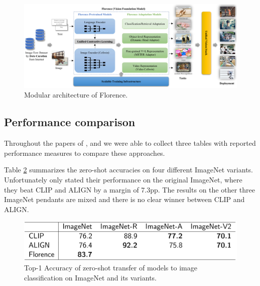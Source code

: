 \documentclass[
]{krantz}
\begin{document}
\begin{figure}

{\centering \includegraphics[width=1\linewidth]{figures/02-04-text-support-img/florence-architecture} 

}

\caption{Modular architecture of Florence.}\label{fig:florence-architecture}
\end{figure}



\hypertarget{performanceComp}{%
\subsection{Performance comparison}\label{performanceComp}}

Throughout the papers of \citet{radford2021learning}, \citet{jia2021scaling} and \citet{yuan2021florence} we were able to collect three tables with reported performance measures to compare these approaches.

Table \ref{fig:table1} summarizes the zero-shot accuracies on four different ImageNet variants.
Unfortunately \citet{yuan2021florence} only stated their performance on the original ImageNet, where they beat CLIP and ALIGN by a margin of 7.3pp.
The results on the other three ImageNet pendants are mixed and there is no clear winner between CLIP and ALIGN.

\begin{figure}

{\centering \includegraphics[width=1\linewidth]{figures/02-04-text-support-img/table-imagenet} 

}

\caption{Top-1 Accuracy of zero-shot transfer of models to image classification on ImageNet and its variants.}\label{fig:table1}
\end{figure}
\end{document}
